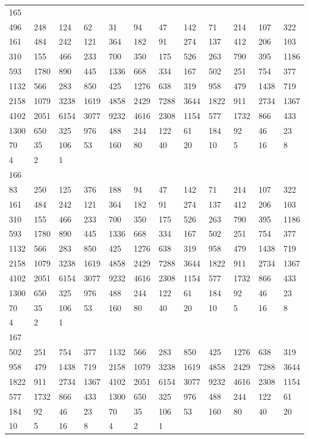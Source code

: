 \begin{longtable}{llllllllllll}
165&&&&&&&&&&&\\
496& 248& 124& 62& 31& 94& 47& 142& 71& 214& 107& 322\\
161& 484& 242& 121& 364& 182& 91& 274& 137& 412& 206& 103\\
310& 155& 466& 233& 700& 350& 175& 526& 263& 790& 395& 1186\\
593& 1780& 890& 445& 1336& 668& 334& 167& 502& 251& 754& 377\\
1132& 566& 283& 850& 425& 1276& 638& 319& 958& 479& 1438& 719\\
2158& 1079& 3238& 1619& 4858& 2429& 7288& 3644& 1822& 911& 2734& 1367\\
4102& 2051& 6154& 3077& 9232& 4616& 2308& 1154& 577& 1732& 866& 433\\
1300& 650& 325& 976& 488& 244& 122& 61& 184& 92& 46& 23\\
70& 35& 106& 53& 160& 80& 40& 20& 10& 5& 16& 8\\
4& 2& 1& \\

166&&&&&&&&&&&\\
83& 250& 125& 376& 188& 94& 47& 142& 71& 214& 107& 322\\
161& 484& 242& 121& 364& 182& 91& 274& 137& 412& 206& 103\\
310& 155& 466& 233& 700& 350& 175& 526& 263& 790& 395& 1186\\
593& 1780& 890& 445& 1336& 668& 334& 167& 502& 251& 754& 377\\
1132& 566& 283& 850& 425& 1276& 638& 319& 958& 479& 1438& 719\\
2158& 1079& 3238& 1619& 4858& 2429& 7288& 3644& 1822& 911& 2734& 1367\\
4102& 2051& 6154& 3077& 9232& 4616& 2308& 1154& 577& 1732& 866& 433\\
1300& 650& 325& 976& 488& 244& 122& 61& 184& 92& 46& 23\\
70& 35& 106& 53& 160& 80& 40& 20& 10& 5& 16& 8\\
4& 2& 1& \\

167&&&&&&&&&&&\\
502& 251& 754& 377& 1132& 566& 283& 850& 425& 1276& 638& 319\\
958& 479& 1438& 719& 2158& 1079& 3238& 1619& 4858& 2429& 7288& 3644\\
1822& 911& 2734& 1367& 4102& 2051& 6154& 3077& 9232& 4616& 2308& 1154\\
577& 1732& 866& 433& 1300& 650& 325& 976& 488& 244& 122& 61\\
184& 92& 46& 23& 70& 35& 106& 53& 160& 80& 40& 20\\
10& 5& 16& 8& 4& 2& 1& \\


\end{longtable}
